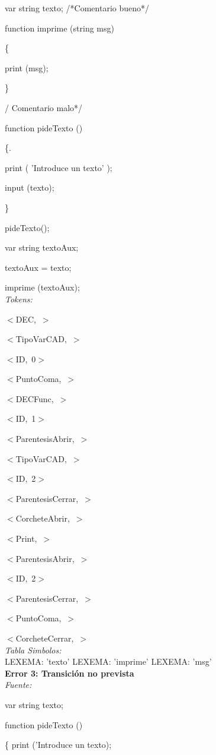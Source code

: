 \documentclass[a4paper, 12pt]{article}
\begin{document}
var string texto; /*Comentario bueno*/

 function imprime (string msg)
 
\{

	print (msg);
	
\} 

/ Comentario malo*/

function pideTexto () 

\{. 

	print ( 'Introduce un texto' ); 
	
	input (texto); 
	
\} 

 pideTexto(); 
 
var string textoAux;

textoAux = texto;

imprime (textoAux);\medskip\\
\emph{Tokens:}


\mbox{$<$DEC, $>$}


\mbox{$<$TipoVarCAD, $>$}


\mbox{$<$ID, 0$>$}


\mbox{$<$PuntoComa, $>$}


\mbox{$<$DECFunc, $>$} 


\mbox{$<$ID, 1$>$}


\mbox{$<$ParentesisAbrir, $>$}


\mbox{$<$TipoVarCAD, $>$}


\mbox{$<$ID, 2$>$}


\mbox{$<$ParentesisCerrar, $>$}


\mbox{$<$CorcheteAbrir, $>$}


\mbox{$<$Print, $>$}


\mbox{$<$ParentesisAbrir, $>$}


\mbox{$<$ID, 2$>$}


\mbox{$<$ParentesisCerrar, $>$}


\mbox{$<$PuntoComa, $>$}

\mbox{$<$CorcheteCerrar, $>$}\medskip\\
\emph{Tabla Simbolos:}\\
  LEXEMA: 'texto'
  LEXEMA: 'imprime'
  LEXEMA: 'msg'\bigskip \\
\textbf{Error 3: Transición no prevista}\\
\emph{Fuente:}

var string texto;

function pideTexto ()

\{
	print ('Introduce un texto);
	
\end{document}
